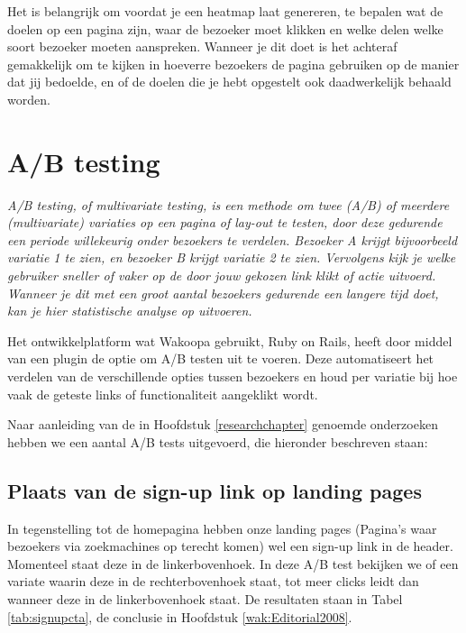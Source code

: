 \documentclass[a4paper, 10pt, pdftex]{report}
\begin{document}
    Het is belangrijk om voordat je een heatmap laat genereren, te bepalen wat de doelen op een pagina zijn, waar de bezoeker moet klikken en welke delen welke soort bezoeker moeten aanspreken. Wanneer je dit doet is het achteraf gemakkelijk om te kijken in hoeverre bezoekers de pagina gebruiken op de manier dat jij bedoelde, en of de doelen die je hebt opgestelt ook daadwerkelijk behaald worden.


    \section{A/B testing}
    \textit{A/B testing, of multivariate testing, is een methode om twee (A/B) of meerdere (multivariate) variaties op een pagina of lay-out te testen, door deze gedurende een periode willekeurig onder bezoekers te verdelen. Bezoeker \emph{A} krijgt bijvoorbeeld variatie 1 te zien, en bezoeker \emph{B} krijgt variatie 2 te zien. Vervolgens kijk je welke gebruiker sneller of vaker op de door jouw gekozen link klikt of actie uitvoerd. Wanneer je dit met een groot aantal bezoekers gedurende een langere tijd doet, kan je hier statistische analyse op uitvoeren.}

   Het ontwikkelplatform wat Wakoopa gebruikt, Ruby on Rails, heeft door middel van een plugin de optie om A/B testen uit te voeren. Deze automatiseert het verdelen van de verschillende opties tussen bezoekers en houd per variatie bij hoe vaak de geteste links of functionaliteit aangeklikt wordt.

    Naar aanleiding van de in Hoofdstuk \ref{researchchapter} genoemde onderzoeken hebben we een aantal A/B tests uitgevoerd, die hieronder beschreven staan:

    \subsection{Plaats van de sign-up link op landing pages}
      \label{ctatest}
      In tegenstelling tot de homepagina hebben onze landing pages (Pagina's waar bezoekers via zoekmachines op terecht komen) wel een sign-up link in de header. Momenteel staat deze in de linkerbovenhoek. In deze A/B test bekijken we of een variate waarin deze in de rechterbovenhoek staat, tot meer clicks leidt dan wanneer deze in de linkerbovenhoek staat. De resultaten staan in Tabel \ref{tab:signupcta}, de conclusie in Hoofdstuk \ref{wak:Editorial2008}.
\end{document}
